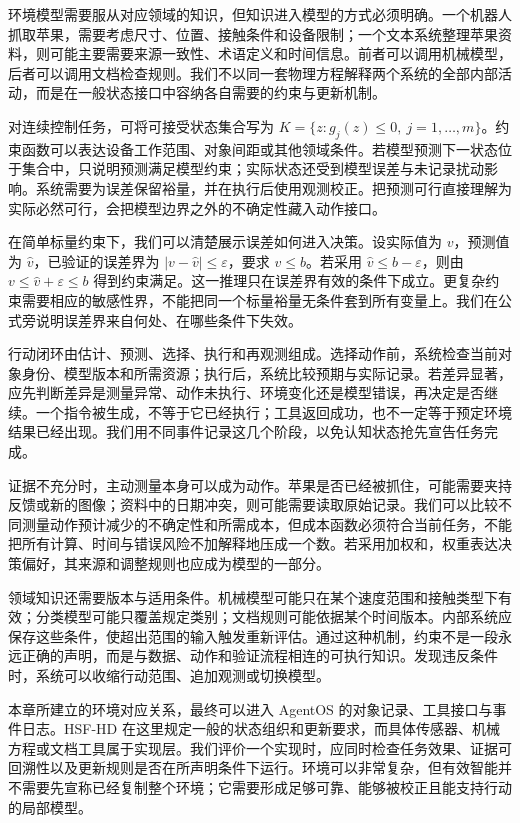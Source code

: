 环境模型需要服从对应领域的知识，但知识进入模型的方式必须明确。一个机器人抓取苹果，需要考虑尺寸、位置、接触条件和设备限制；一个文本系统整理苹果资料，则可能主要需要来源一致性、术语定义和时间信息。前者可以调用机械模型，后者可以调用文档检查规则。我们不以同一套物理方程解释两个系统的全部内部活动，而是在一般状态接口中容纳各自需要的约束与更新机制。

对连续控制任务，可将可接受状态集合写为 $K=\{z:g_j(z)\leq0,\ j=1,\ldots,m\}$。约束函数可以表达设备工作范围、对象间距或其他领域条件。若模型预测下一状态位于集合中，只说明预测满足模型约束；实际状态还受到模型误差与未记录扰动影响。系统需要为误差保留裕量，并在执行后使用观测校正。把预测可行直接理解为实际必然可行，会把模型边界之外的不确定性藏入动作接口。

在简单标量约束下，我们可以清楚展示误差如何进入决策。设实际值为 $v$，预测值为 $\widehat v$，已验证的误差界为 $|v-\widehat v|\leq\varepsilon$，要求 $v\leq b$。若采用 $\widehat v\leq b-\varepsilon$，则由 $v\leq\widehat v+\varepsilon\leq b$ 得到约束满足。这一推理只在误差界有效的条件下成立。更复杂约束需要相应的敏感性界，不能把同一个标量裕量无条件套到所有变量上。我们在公式旁说明误差界来自何处、在哪些条件下失效。

行动闭环由估计、预测、选择、执行和再观测组成。选择动作前，系统检查当前对象身份、模型版本和所需资源；执行后，系统比较预期与实际记录。若差异显著，应先判断差异是测量异常、动作未执行、环境变化还是模型错误，再决定是否继续。一个指令被生成，不等于它已经执行；工具返回成功，也不一定等于预定环境结果已经出现。我们用不同事件记录这几个阶段，以免认知状态抢先宣告任务完成。

证据不充分时，主动测量本身可以成为动作。苹果是否已经被抓住，可能需要夹持反馈或新的图像；资料中的日期冲突，则可能需要读取原始记录。我们可以比较不同测量动作预计减少的不确定性和所需成本，但成本函数必须符合当前任务，不能把所有计算、时间与错误风险不加解释地压成一个数。若采用加权和，权重表达决策偏好，其来源和调整规则也应成为模型的一部分。

领域知识还需要版本与适用条件。机械模型可能只在某个速度范围和接触类型下有效；分类模型可能只覆盖规定类别；文档规则可能依据某个时间版本。内部系统应保存这些条件，使超出范围的输入触发重新评估。通过这种机制，约束不是一段永远正确的声明，而是与数据、动作和验证流程相连的可执行知识。发现违反条件时，系统可以收缩行动范围、追加观测或切换模型。

本章所建立的环境对应关系，最终可以进入 AgentOS 的对象记录、工具接口与事件日志。HSF-HD 在这里规定一般的状态组织和更新要求，而具体传感器、机械方程或文档工具属于实现层。我们评价一个实现时，应同时检查任务效果、证据可回溯性以及更新规则是否在所声明条件下运行。环境可以非常复杂，但有效智能并不需要先宣称已经复制整个环境；它需要形成足够可靠、能够被校正且能支持行动的局部模型。
